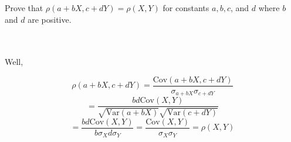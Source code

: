 Prove that $\rho(a+bX,c+dY)=\rho(X,Y)$ for constants $a, b, c$, and $d$ where $b$ and $d$ are
positive.\\\\

\begin{solution}\renewcommand{\qedsymbol}{}\ \\
    Well,
    
    $$\rho(a+bX,c+dY)=\frac{\text{Cov}(a+bX,c+dY)}{\sigma_{a+bX}\sigma_{c+dY}}$$
    $$=\frac{bd\text{Cov}(X,Y)}{\sqrt{\text{Var}(a+bX)}\sqrt{\text{Var}(c+dY)}}$$
    $$=\frac{bd\text{Cov}(X,Y)}{b\sigma_Xd\sigma_Y}=\frac{\text{Cov}(X,Y)}{\sigma_X\sigma_Y}=\rho(X,Y)$$

\end{solution}